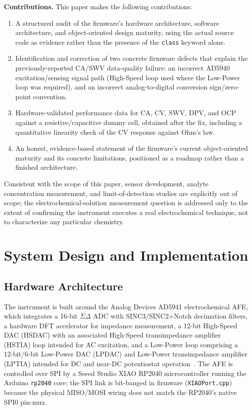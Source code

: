 \documentclass[journal]{IEEEtran}
\begin{document}
\textbf{Contributions.} This paper makes the following contributions:
\begin{enumerate}
\item A structured audit of the firmware's hardware architecture, software architecture, and object-oriented design maturity, using the actual source code as evidence rather than the presence of the \texttt{class} keyword alone.
\item Identification and correction of two concrete firmware defects that explain the previously-reported CA/SWV data-quality failure: an incorrect AD5940 excitation/sensing signal path (High-Speed loop used where the Low-Power loop was required), and an incorrect analog-to-digital conversion sign/zero-point convention.
\item Hardware-validated performance data for CA, CV, SWV, DPV, and OCP against a resistive/capacitive dummy cell, obtained after the fix, including a quantitative linearity check of the CV response against Ohm's law.
\item An honest, evidence-based statement of the firmware's current object-oriented maturity and its concrete limitations, positioned as a roadmap rather than a finished architecture.
\end{enumerate}

Consistent with the scope of this paper, sensor development, analyte concentration measurement, and limit-of-detection studies are explicitly out of scope; the electrochemical-solution measurement question is addressed only to the extent of confirming the instrument executes a real electrochemical technique, not to characterize any particular chemistry.

\section{System Design and Implementation}

\subsection{Hardware Architecture}
The instrument is built around the Analog Devices AD5941 electrochemical AFE, which integrates a 16-bit $\Sigma\Delta$ ADC with SINC3/SINC2+Notch decimation filters, a hardware DFT accelerator for impedance measurement, a 12-bit High-Speed DAC (HSDAC) with an associated High-Speed transimpedance amplifier (HSTIA) loop intended for AC excitation, and a Low-Power loop comprising a 12-bit/6-bit Low-Power DAC (LPDAC) and Low-Power transimpedance amplifier (LPTIA) intended for DC and near-DC potentiostat operation~\cite{ref:ad5940datasheet}. The AFE is controlled over SPI by a Seeed Studio XIAO RP2040 microcontroller running the Arduino \texttt{rp2040} core; the SPI link is bit-banged in firmware (\texttt{XIAOPort.cpp}) because the physical MISO/MOSI wiring does not match the RP2040's native SPI0 pin-mux.
\end{document}
